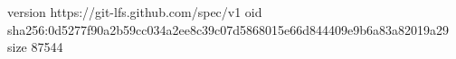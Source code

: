 version https://git-lfs.github.com/spec/v1
oid sha256:0d5277f90a2b59cc034a2ee8c39c07d5868015e66d844409e9b6a83a82019a29
size 87544
